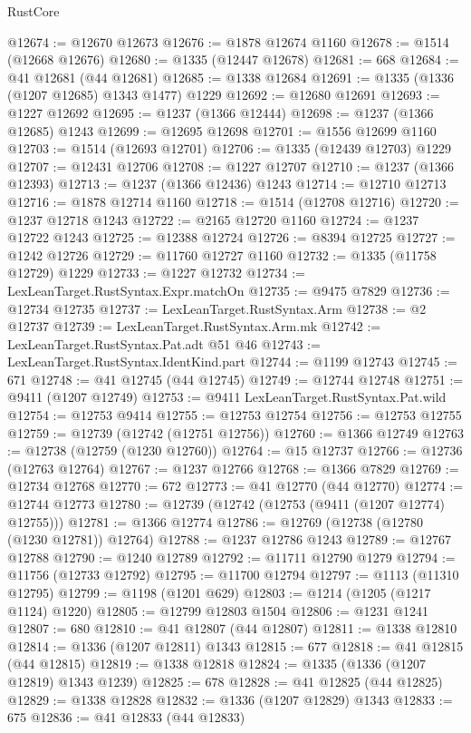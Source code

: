 \begin{lexlean}{RustCore}
\begin{coremodule}
@12674 := @12670 @12673
@12676 := @1878 @12674 @1160
@12678 := @1514 (@12668 @12676)
@12680 := @1335 (@12447 @12678)
@12681 := 668
@12684 := @41 @12681 (@44 @12681)
@12685 := @1338 @12684
@12691 := @1335 (@1336 (@1207 @12685) @1343 @1477) @1229
@12692 := @12680 @12691
@12693 := @1227 @12692
@12695 := @1237 (@1366 @12444)
@12698 := @1237 (@1366 @12685) @1243
@12699 := @12695 @12698
@12701 := @1556 @12699 @1160
@12703 := @1514 (@12693 @12701)
@12706 := @1335 (@12439 @12703) @1229
@12707 := @12431 @12706
@12708 := @1227 @12707
@12710 := @1237 (@1366 @12393)
@12713 := @1237 (@1366 @12436) @1243
@12714 := @12710 @12713
@12716 := @1878 @12714 @1160
@12718 := @1514 (@12708 @12716)
@12720 := @1237 @12718 @1243
@12722 := @2165 @12720 @1160
@12724 := @1237 @12722 @1243
@12725 := @12388 @12724
@12726 := @8394 @12725
@12727 := @1242 @12726
@12729 := @11760 @12727 @1160
@12732 := @1335 (@11758 @12729) @1229
@12733 := @1227 @12732
@12734 := LexLeanTarget.RustSyntax.Expr.matchOn
@12735 := @9475 @7829
@12736 := @12734 @12735
@12737 := LexLeanTarget.RustSyntax.Arm
@12738 := @2 @12737
@12739 := LexLeanTarget.RustSyntax.Arm.mk
@12742 := LexLeanTarget.RustSyntax.Pat.adt @51 @46
@12743 := LexLeanTarget.RustSyntax.IdentKind.part
@12744 := @1199 @12743
@12745 := 671
@12748 := @41 @12745 (@44 @12745)
@12749 := @12744 @12748
@12751 := @9411 (@1207 @12749)
@12753 := @9411 LexLeanTarget.RustSyntax.Pat.wild
@12754 := @12753 @9414
@12755 := @12753 @12754
@12756 := @12753 @12755
@12759 := @12739 (@12742 (@12751 @12756))
@12760 := @1366 @12749
@12763 := @12738 (@12759 (@1230 @12760))
@12764 := @15 @12737
@12766 := @12736 (@12763 @12764)
@12767 := @1237 @12766
@12768 := @1366 @7829
@12769 := @12734 @12768
@12770 := 672
@12773 := @41 @12770 (@44 @12770)
@12774 := @12744 @12773
@12780 := @12739 (@12742 (@12753 (@9411 (@1207 @12774) @12755)))
@12781 := @1366 @12774
@12786 := @12769 (@12738 (@12780 (@1230 @12781)) @12764)
@12788 := @1237 @12786 @1243
@12789 := @12767 @12788
@12790 := @1240 @12789
@12792 := @11711 @12790 @1279
@12794 := @11756 (@12733 @12792)
@12795 := @11700 @12794
@12797 := @1113 (@11310 @12795)
@12799 := @1198 (@1201 @629)
@12803 := @1214 (@1205 (@1217 @1124) @1220)
@12805 := @12799 @12803 @1504
@12806 := @1231 @1241
@12807 := 680
@12810 := @41 @12807 (@44 @12807)
@12811 := @1338 @12810
@12814 := @1336 (@1207 @12811) @1343
@12815 := 677
@12818 := @41 @12815 (@44 @12815)
@12819 := @1338 @12818
@12824 := @1335 (@1336 (@1207 @12819) @1343 @1239)
@12825 := 678
@12828 := @41 @12825 (@44 @12825)
@12829 := @1338 @12828
@12832 := @1336 (@1207 @12829) @1343
@12833 := 675
@12836 := @41 @12833 (@44 @12833)

\end{coremodule}
\end{lexlean}

